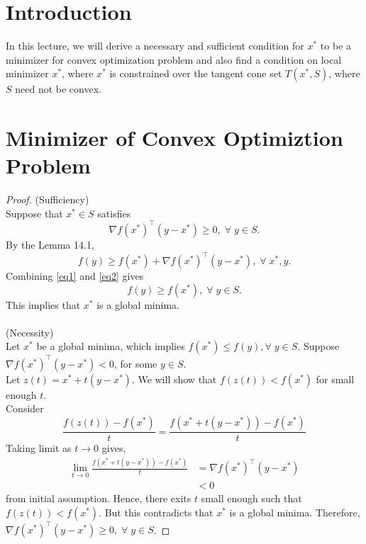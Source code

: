 \documentclass[twoside]{article}
\begin{document}
\section{Introduction}
In this lecture, we will derive a necessary and sufficient condition for $x^{*}$ to be a minimizer for convex optimization problem and also find a condition on local minimizer $x^{*}$, where $x^{*}$ is constrained over the tangent cone set $T(x^{*}, S)$, where $S$ need not be convex. 

\section{Minimizer of Convex Optimiztion Problem}


\begin{proof}
(Sufficiency)\\
Suppose that $x^{*} \in S$ satisfies
\begin{equation}\label{eq1}
    \nabla f(x^{*})^\top(y-x^{*}) \geqslant 0,  \; \forall \;  y \in S.
\end{equation}
By the Lemma 14.1,
\begin{equation}\label{eq2}
    f(y) \geqslant f(x^{*})+\nabla f(x^{*})^\top(y-x^{*}), \; \forall \;  x^{*},y.
\end{equation}
Combining \eqref{eq1} and \eqref{eq2} gives
\begin{equation}\label{eq3}
    f(y) \geqslant f(x^{*}),  \; \forall \; y \in S.
\end{equation}
This implies that $x^{*}$ is a global minima.\\\\
(Necessity)\\
Let $x^{*}$ be a global minima, which implies $f(x^{*}) \leqslant f(y), \forall \; y \in S$. Suppose $\nabla f(x^{*})^{\top}(y-x^{*}) < 0$, for some $y \in S$.\\
Let $z(t)=x^{*}+t(y-x^{*})$. We will show that $f(z(t))<f(x^{*})$ for small enough $t$.\\
Consider\\
\begin{equation}\label{eq4}
\frac{f(z(t))-f(x^{*})}{t} = \frac{f(x^{*}+t(y-x^{*}))-f(x^{*})}{t}
\end{equation}
Taking limit as $t \rightarrow 0$ gives,
\begin{equation}\label{eq5}
\begin{split}
\lim_{t\to 0}\frac{f(x^{*}+t(y-x^{*}))-f(x^{*})}{t} &= \nabla f(x^{*})^{\top}(y-x^{*})\\
&< 0
\end{split}
\end{equation}
from initial assumption. Hence, there exits $t$ small enough such that $f(z(t))<f(x^{*})$. But this contradicts that $x^{*}$ is a global minima.
Therefore, $\nabla f(x^{*})^{\top}(y-x^{*}) \geqslant 0,  \; \forall \; y \in S$.
\end{proof}
\end{document}
